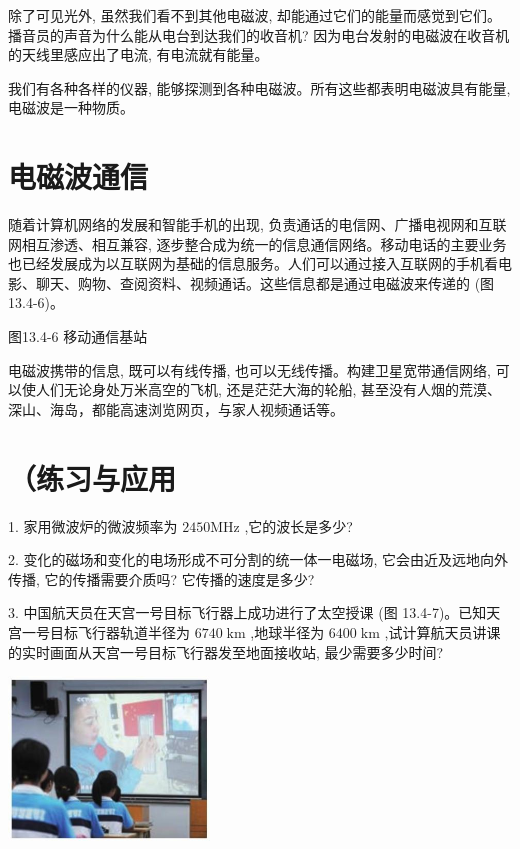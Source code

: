 \documentclass[10pt]{article}
\begin{document}
除了可见光外, 虽然我们看不到其他电磁波, 却能通过它们的能量而感觉到它们。播音员的声音为什么能从电台到达我们的收音机? 因为电台发射的电磁波在收音机的天线里感应出了电流, 有电流就有能量。

我们有各种各样的仪器, 能够探测到各种电磁波。所有这些都表明电磁波具有能量, 电磁波是一种物质。

\section*{电磁波通信}

随着计算机网络的发展和智能手机的出现, 负责通话的电信网、广播电视网和互联网相互渗透、相互兼容, 逐步整合成为统一的信息通信网络。移动电话的主要业务也已经发展成为以互联网为基础的信息服务。人们可以通过接入互联网的手机看电影、聊天、购物、查阅资料、视频通话。这些信息都是通过电磁波来传递的 (图13.4-6)。

图13.4-6 移动通信基站

电磁波携带的信息, 既可以有线传播, 也可以无线传播。构建卫星宽带通信网络, 可以使人们无论身处万米高空的飞机, 还是茫茫大海的轮船, 甚至没有人烟的荒漠、 深山、海岛，都能高速浏览网页，与家人视频通话等。

\section*{（练习与应用}

1. 家用微波炉的微波频率为 \({2450}\mathrm{{MHz}}\) ,它的波长是多少?

2. 变化的磁场和变化的电场形成不可分割的统一体一电磁场, 它会由近及远地向外传播, 它的传播需要介质吗? 它传播的速度是多少?

3. 中国航天员在天宫一号目标飞行器上成功进行了太空授课 (图 13.4-7)。已知天宫一号目标飞行器轨道半径为 \({6740}\mathrm{\;{km}}\) ,地球半径为 \({6400}\mathrm{\;{km}}\) ,试计算航天员讲课的实时画面从天宫一号目标飞行器发至地面接收站, 最少需要多少时间?

\begin{center}
\includegraphics[max width=0.4\textwidth]{images/01911d5f-8e38-70c0-b5b8-2b399bd115b6_128_360497.jpg}
\end{center}
\end{document}
